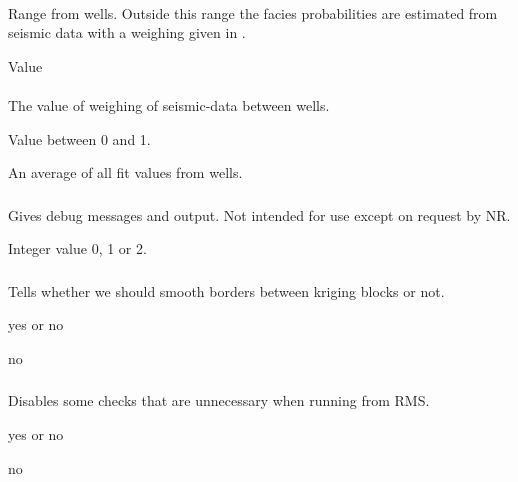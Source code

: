 \paragraph{}
 \slist
   \item \Description Range from wells. Outside this range the facies probabilities are estimated from seismic data with a weighing given in .
   \item \Argument Value
   \item {}
 \elist 
 
\paragraph{}
 \slist
   \item \Description The value of weighing of seismic-data between wells.
   \item \Argument Value between 0 and 1.
   \item \Default An average of all fit values from wells.
 \elist 

\subsubsection{}
 \slist
   \item \Description Gives debug messages and output. Not intended for use except on request by NR.
   \item \Argument Integer value 0, 1 or 2.
   \item {}
 \elist

\subsubsection{}
\slist
   \item \Description Tells whether we should smooth borders between kriging blocks or not.
   \item \Argument yes or no
   \item \Default no
\elist

\subsubsection{}
\slist
   \item \Description Disables some checks that are unnecessary when
   running from RMS.
   \item \Argument yes or no
   \item \Default no
\elist

